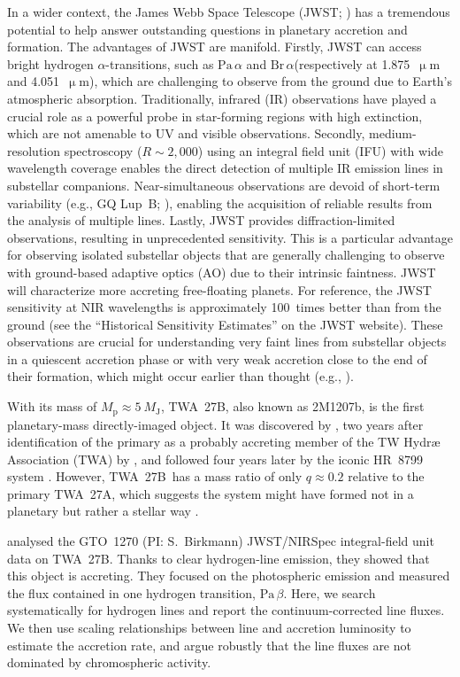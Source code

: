 \documentclass[twocolumn,twocolumnappendix]{aastex631}
\def\mum{\ensuremath{\upmu\mathrm{m}}\xspace}
\newcommand{\neuI}[1]{{\leavevmode{\boldmath\bfseries#1}}}
\renewcommand{\neuI}[1]{{\leavevmode#1}}
\def\MJ{\ensuremath{M_{\textrm{J}}}\xspace}        %
\def\Paa{\ensuremath{\mathrm{Pa}\,\alpha}\xspace}           %
\def\Pab{\ensuremath{\mathrm{Pa}\,\beta}\xspace}            %
\def\Bra{\ensuremath{\mathrm{Br}\,\alpha}\xspace}           %
\def\MP{\ensuremath{M_{\textrm{p}}}\xspace}        %
\def\twa{TWA~27A\xspace}
\def\twb{TWA~27B\xspace}
\begin{document}
\neuI{%
In a wider context, the James Webb Space Telescope (JWST; \citealp{gardner23}) has a tremendous potential to help answer outstanding questions in planetary accretion and formation.
%
%
%
%
The advantages of JWST are manifold.
Firstly, JWST can access bright hydrogen $\alpha$-transitions, such as \Paa and \Bra (respectively at 1.875~\mum and 4.051~\mum), which are challenging to observe from the ground due to Earth's atmospheric absorption. Traditionally, infrared (IR) observations have played a crucial role as a powerful probe in star-forming regions with high extinction, which are not amenable to UV and visible observations.
Secondly, medium-resolution spectroscopy ($R\sim2,000$) using an integral field unit (IFU) with wide wavelength coverage enables the direct detection of multiple IR emission lines in substellar companions. Near-simultaneous observations are devoid of short-term variability (e.g., GQ Lup~B; \citealp{demars23}), enabling the acquisition of reliable results from the analysis of multiple lines.
Lastly, JWST provides diffraction-limited observations, resulting in unprecedented sensitivity. This is a particular advantage for observing isolated substellar objects that are generally challenging to observe with ground-based adaptive optics (AO) due to their intrinsic faintness. JWST will characterize more accreting free-floating planets. For reference, the JWST sensitivity at NIR wavelengths is approximately 100~times better than from the ground (see the ``Historical Sensitivity Estimates'' on the JWST website).  %
%
These observations are crucial for understanding very faint lines from substellar objects in a quiescent accretion phase \citep[e.g.,][]{brittain20} or with very weak accretion close to the end of their formation, which might occur earlier than thought (e.g., \citealp{wagner23}).%
}


With its mass of $\MP\approx5~\MJ$, 
\twb, also known as 2M1207b, is the first planetary-mass directly-imaged object. It was discovered by \citet{chauvin04}, two years after identification of the primary as a probably accreting member of the TW Hydr\ae{} Association (TWA) by \citet{gizis02}, and followed four years later by the iconic
%
%
HR~8799 system \citep{marois08,marois10}.
However, \twb\ \neuI{has a mass ratio of only $q\approx0.2$ relative to} the primary \twa, \neuI{which suggests the} system might have formed \neuI{not in a planetary but rather a stellar way \citep{lodato05,mohanty13,reggiani16,bowler20}}.

\citet{luhman23c} \neuI{analysed the GTO~1270 (PI: S.~Birkmann) JWST/NIRSpec \citep{jakobsen22} integral-ﬁeld unit \citep{boeker22} data on} \twb. Thanks to clear hydrogen-line emission, they showed that this object is accreting. They focused on the photospheric emission and measured the flux contained in one hydrogen transition, \Pab.
Here, we search systematically for hydrogen lines and report the continuum-corrected line fluxes. We then use scaling relationships between line and accretion luminosity to estimate the accretion rate, \neuI{and argue robustly that the line fluxes are not dominated by chromospheric activity}.
\end{document}
